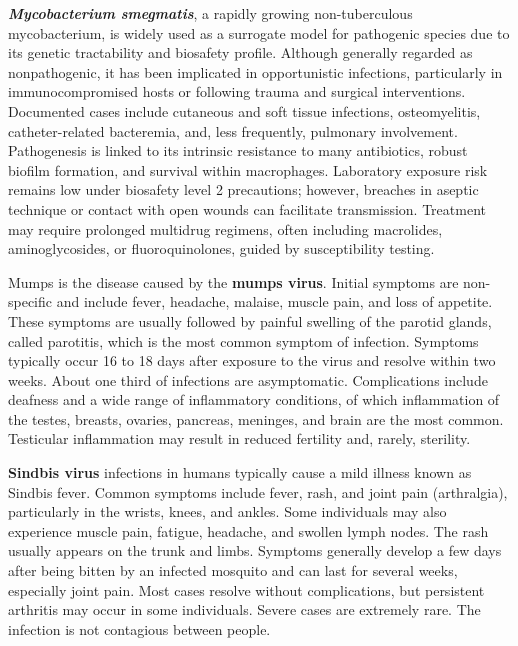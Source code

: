 \textbf{\emph{Mycobacterium smegmatis}}, a rapidly growing non-tuberculous mycobacterium, is widely used as a surrogate model for pathogenic species due to its genetic tractability and biosafety profile. Although generally regarded as nonpathogenic, it has been implicated in opportunistic infections, particularly in immunocompromised hosts or following trauma and surgical interventions. Documented cases include cutaneous and soft tissue infections, osteomyelitis, catheter-related bacteremia, and, less frequently, pulmonary involvement. Pathogenesis is linked to its intrinsic resistance to many antibiotics, robust biofilm formation, and survival within macrophages. Laboratory exposure risk remains low under biosafety level 2 precautions; however, breaches in aseptic technique or contact with open wounds can facilitate transmission. Treatment may require prolonged multidrug regimens, often including macrolides, aminoglycosides, or fluoroquinolones, guided by susceptibility testing. 
\newline

Mumps is the disease caused by the \textbf{mumps virus}. Initial symptoms are non-specific and include fever, headache, malaise, muscle pain, and loss of appetite. These symptoms are usually followed by painful swelling of the parotid glands, called parotitis, which is the most common symptom of infection. Symptoms typically occur 16 to 18 days after exposure to the virus and resolve within two weeks. About one third of infections are asymptomatic. Complications include deafness and a wide range of inflammatory conditions, of which inflammation of the testes, breasts, ovaries, pancreas, meninges, and brain are the most common. Testicular inflammation may result in reduced fertility and, rarely, sterility. 
\newline

\textbf{Sindbis virus} infections in humans typically cause a mild illness known as Sindbis fever. Common symptoms include fever, rash, and joint pain (arthralgia), particularly in the wrists, knees, and ankles. Some individuals may also experience muscle pain, fatigue, headache, and swollen lymph nodes. The rash usually appears on the trunk and limbs. Symptoms generally develop a few days after being bitten by an infected mosquito and can last for several weeks, especially joint pain. Most cases resolve without complications, but persistent arthritis may occur in some individuals. Severe cases are extremely rare. The infection is not contagious between people.
\newline

